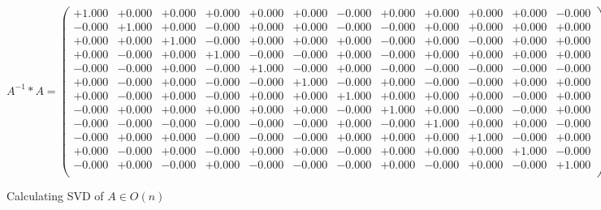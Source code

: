 \documentclass[9pt]{article}
\theoremstyle{plain}
\theoremstyle{definition}
\theoremstyle{remark}
\numberwithin{equation}{section}
\begin{document}
$A^{-1} *A = \left(
\begin{array}{
cccccccccccc}
+1.000 & +0.000 & +0.000 & +0.000 & +0.000 & +0.000 & -0.000 & +0.000 & +0.000 & +0.000 & +0.000 & -0.000 \\
-0.000 & +1.000 & +0.000 & -0.000 & +0.000 & +0.000 & -0.000 & -0.000 & +0.000 & +0.000 & +0.000 & +0.000 \\
+0.000 & +0.000 & +1.000 & -0.000 & +0.000 & +0.000 & +0.000 & -0.000 & +0.000 & -0.000 & +0.000 & +0.000 \\
+0.000 & -0.000 & +0.000 & +1.000 & -0.000 & -0.000 & +0.000 & -0.000 & +0.000 & +0.000 & +0.000 & +0.000 \\
-0.000 & -0.000 & +0.000 & -0.000 & +1.000 & -0.000 & +0.000 & -0.000 & -0.000 & -0.000 & -0.000 & -0.000 \\
+0.000 & -0.000 & +0.000 & -0.000 & -0.000 & +1.000 & -0.000 & +0.000 & -0.000 & -0.000 & +0.000 & +0.000 \\
+0.000 & -0.000 & +0.000 & -0.000 & +0.000 & +0.000 & +1.000 & +0.000 & +0.000 & +0.000 & -0.000 & +0.000 \\
-0.000 & +0.000 & +0.000 & +0.000 & +0.000 & +0.000 & -0.000 & +1.000 & +0.000 & -0.000 & -0.000 & +0.000 \\
-0.000 & -0.000 & -0.000 & -0.000 & -0.000 & -0.000 & +0.000 & -0.000 & +1.000 & +0.000 & +0.000 & -0.000 \\
-0.000 & +0.000 & +0.000 & -0.000 & -0.000 & -0.000 & +0.000 & +0.000 & +0.000 & +1.000 & -0.000 & +0.000 \\
+0.000 & -0.000 & +0.000 & -0.000 & +0.000 & +0.000 & -0.000 & +0.000 & +0.000 & +0.000 & +1.000 & -0.000 \\
-0.000 & +0.000 & -0.000 & +0.000 & -0.000 & -0.000 & -0.000 & +0.000 & -0.000 & +0.000 & -0.000 & +1.000 \\
\end{array}
\right)$ \newline 

Calculating SVD of  $A \in O(n)$
\end{document}
